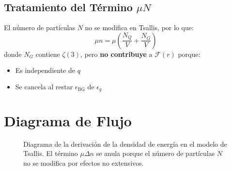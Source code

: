 \subsection{Tratamiento del Término $\mu N$}
El número de partículas $N$ no se modifica en Tsallis, por lo que:
\begin{equation}
\mu n = \mu\left(\frac{N_Q}{V} + \frac{N_G}{V}\right)
\end{equation}
donde $N_G$ contiene $\zeta(3)$, pero \textbf{no contribuye} a $\mathcal{F}(r)$ porque:
\begin{itemize}
    \item Es independiente de $q$
    \item Se cancela al restar $\epsilon_{\text{BG}}$ de $\epsilon_q$
\end{itemize}

\section{Diagrama de Flujo} \label{app:flow}
\begin{figure}[H]
\centering
{}
\caption{Diagrama de la derivación de la densidad de energía en el modelo de Tsallis. El término $\mu \Delta n$ se anula porque el número de partículas $N$ no se modifica por efectos no extensivos.}
\label{fig:derivation-flow}
\end{figure}




